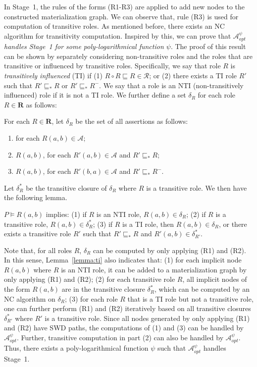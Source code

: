 In Stage~1, the rules of the forms (R1-R3)
are applied to add new nodes to the constructed materialization graph.
We can observe that, rule (R3) is used for computation of transitive roles.
As mentioned before, there exists an NC algorithm for transitivity computation.
Inspired by this, we can prove that \emph{$\mathcal{A}_{opt}^\psi$
handles Stage~1 for some poly-logarithmical function $\psi$}.
The proof of this result can be shown by separately considering non-transitive roles and
the roles that are transitive or influenced by transitive roles.
Specifically, we say that role $R$ is \emph{transitively influenced} (TI)
if (1) $R\circ R\sqsubseteq R\in\mathcal{R}$; or
(2) there exists a TI role $R'$ such that $R'\sqsubseteq_*R$ or $R'\sqsubseteq_*R^-$.
We say that a role is an NTI (non-transitively influenced) role if it is not a TI role.
We further define a set $\delta_R$ for each role $R\in\textbf{R}$ as follows:

\begin{definition}\label{def:deltaRdhl}
For each $R\in\textbf{R}$, let $\delta_R$ be the set of all assertions as follows:
\begin{enumerate}[leftmargin=4ex,label=\arabic*.]
\item for each $R(a,b)\in\mathcal{A}$;
\item $R(a,b)$, for each $R'(a,b)\in\mathcal{A}$ and $R'\sqsubseteq_{*}R$;
\item $R(a,b)$, for each $R'(b,a)\in\mathcal{A}$ and $R'\sqsubseteq_{*}R^-$.
\end{enumerate}
\end{definition}

Let $\delta^*_R$ be the transitive closure of $\delta_R$ where $R$ is a transitive role.
We then have the following lemma.

\begin{lemma}\label{lemma:ti}
$P\models R(a,b)$ implies: (1) if $R$ is an NTI role, $R(a,b)\in\delta_R$;
(2) if $R$ is a transitive role, $R(a,b)\in\delta^*_{R}$;
(3) if $R$ is a TI role, then $R(a,b)\in\delta_R$, or there exists a transitive
role $R'$ such that $R'\sqsubseteq_* R$ and $R'(a,b)\in\delta^*_{R'}$.
\end{lemma}

Note that, for all roles $R$, $\delta_R$ can be computed by only applying (R1) and (R2).
In this sense, Lemma~\ref{lemma:ti} also indicates that:
(1) for each implicit node $R(a,b)$ where $R$ is an NTI role,
it can be added to a materialization graph by only applying (R1) and (R2);
(2) for each transitive role $R$, all implicit nodes of the form $R(a,b)$ are in the transitive closure $\delta^*_{R}$,
which can be computed by an NC algorithm on $\delta_{R}$;
(3) for each role $R$ that is a TI role but not a transitive role,
one can further perform (R1) and (R2) iteratively based on all transitive closures $\delta^*_{R'}$
where $R'$ is a transitive role.
Since all nodes generated by only applying (R1) and (R2) have SWD paths,
the computations of (1) and (3) can be handled by $\mathcal{A}_{opt}^\psi$.
Further, transitive computation in part (2) can also be handled by $\mathcal{A}_{opt}^\psi$.
Thus, there exists a poly-logarithmical function $\psi$
such that $\mathcal{A}_{opt}^\psi$ handles Stage~1.

